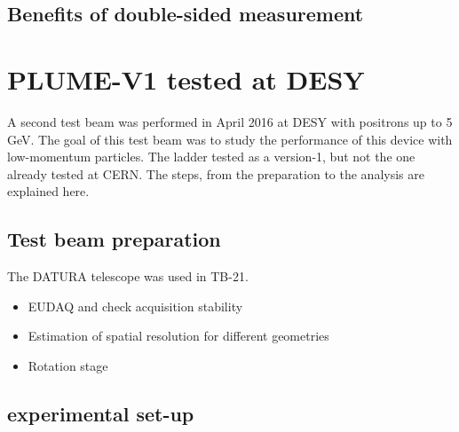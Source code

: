     \begin{figure}
    \end{figure}

    \begin{figure}
    \end{figure}
    
    \subsection{Benefits of double-sided measurement}


  \section{PLUME-V1 tested at DESY}

   A second test beam was performed in April 2016 at DESY with positrons up to 5 GeV. 
   The goal of this test beam was to study the performance of this device with low-momentum particles.
   The ladder tested as a version-1, but not the one already tested at CERN.
   The steps, from the preparation to the analysis are explained here.

    \subsection{Test beam preparation}

    The DATURA telescope was used in TB-21. 
    \begin{itemize}
      \item EUDAQ and check acquisition stability
      \item Estimation of spatial resolution for different geometries
      \item Rotation stage
    \end{itemize}

    \begin{figure}
    \end{figure}

    \begin{figure}
    \end{figure}

    \subsection{experimental set-up}

